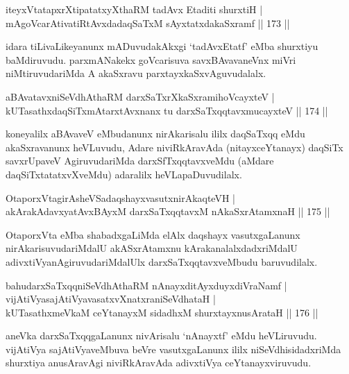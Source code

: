 \begin{shl}
iteyxVtatapxrXtipatatxyXthaRM tadAvx Etaditi shurxtiH |\\
mAgoVcarAtivatiRtAvxdadaqSaTxM sAyxtatxdakaSxramf \hfill || 173 ||
\end{shl}

\begin{artha}
idara tiLivaLikeyanunx mADuvudakAkxgi `tadAvxEtatf' eMba shurxtiyu baMdiruvudu. parxmANakekx goVcarisuva savxBAvavaneVnx miVri niMtiruvudariMda A akaSxravu parxtayxkaSxvAguvudalalx.
\end{artha}

\begin{shl}
aBAvatavxniSeVdhAthaRM darxSaTxrXkaSxramihoVcayxteV |\\
kUTasathxdaqSiTxmAtarxtAvxnanx tu darxSaTxqqtavxmucayxteV \hfill || 174 ||
\end{shl}

\begin{artha}
koneyalilx aBAvaveV eMbudanunx nirAkarisalu ililx daqSaTxqq eMdu akaSxravanunx heVLuvudu, Adare niviRkAravAda (nitayxceYtanayx) daqSiTx savxrUpaveV AgiruvudariMda darxSfTxqqtavxveMdu (aMdare daqSiTxtatatxvXveMdu) adaralilx heVLapaDuvudilalx.
\end{artha}

\begin{shl}
OtaporxVtagirA\s sheVSadaqshayxvasutxnirAkaqteVH |\\
akArakAdavxyatAvxBAyxM darxSaTxqqtavxM nAkaSxrAtamxnaH \hfill || 175 ||
\end{shl}

\begin{artha}
OtaporxVta eMba shabadxgaLiMda elAlx daqshayx vasutxgaLanunx nirAkarisuvudariMdalU akASxrAtamxnu kArakanalalxdadxriMdalU adivxtiVyanAgiruvudariMdalUlx darxSaTxqqtavxveMbudu baruvudilalx.
\end{artha}


\begin{shl}
bahudarxSaTxqqniSeVdhAthaRM nAnayxditAyxduyxdiVraNamf |\\
vijAtiVyasajAtiVyavasatxvXnatxraniSeVdhataH |\\
kUTasathxmeVkaM ceYtanayxM sidadhxM shurxtayxnusArataH \hfill || 176 ||
\end{shl}

\begin{artha}
aneVka darxSaTxqqgaLanunx nivArisalu `nAnayxtf' eMdu heVLiruvudu. vijAtiVya sajAtiVyaveMbuva beVre vasutxgaLanunx ililx niSeVdhisidadxriMda shurxtiya anusAra\-vAgi niviRkAravAda adivxtiVya ceYtanayxviruvudu.
\end{artha}

